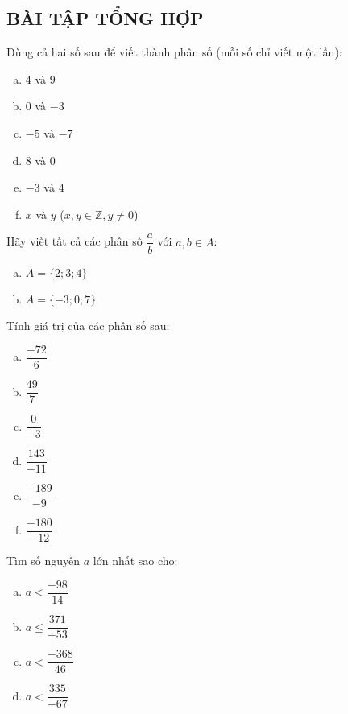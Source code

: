 \begin{bt}
\subsection{BÀI TẬP TỔNG HỢP}
\end{bt}   \begin{bt}
Dùng cả hai số sau để viết thành phân số (mỗi số chỉ viết một lần):
\begin{multicols}{2}
\begin{enumerate}[a)]
\item $4$ và $9$
\item $0$ và $-3$
\item $-5$ và $-7$
\item $8$ và $0$
\item $-3$ và $4$
\item $x$ và $y$ \;\; ($x, y \in \mathbb{Z}, y \neq 0$)
\end{enumerate}
\end{multicols}

\end{bt}   \begin{bt}
Hãy viết tất cả các phân số $\dfrac{a}{b}$ với $a,b \in A$:
\begin{enumerate}[a)]
\item $A= \{ 2; 3; 4 \}$
\item $A = \{-3; 0; 7\}$
\end{enumerate}

\end{bt}   \begin{bt}
Tính giá trị của các phân số sau:
\begin{multicols}{2}
\begin{enumerate}[a)]
\item $\dfrac{-72}{6}$
\item $\dfrac{49}{7}$
\item $\dfrac{ 0}{-3}$
\item $\dfrac{143}{-11}$
\item $\dfrac{-189}{-9}$
\item $\dfrac{-180}{-12}$
\end{enumerate}
\end{multicols}

\end{bt}   \begin{bt}
Tìm số nguyên $a$ lớn nhất sao cho:
\begin{multicols}{2}
\begin{enumerate}[a)]
\item $a< \dfrac{-98}{14}$
\item $a \leq \dfrac{371}{-53}$
\item $a < \dfrac{-368}{46}$
\item $a< \dfrac{335}{-67}$
\end{enumerate}
\end{multicols}


\end{bt}
